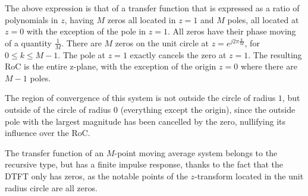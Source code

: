 \documentclass[\documentfontsize, twocolumn]{\classname}
\begin{document}
The above expression is that of a transfer function that is expressed as a ratio of polynomials in $z$, having $M$ zeros all located in $z = 1$ and $M$ poles, all located at $z=0$ with the exception of the pole in $z=1$. All zeros have their phase moving of a quantity $\frac 1 M$. There are $M$ zeros on the unit circle at $z=e^{j2\pi \frac k M}$, for $0 \leq k \leq M-1$. The pole at $z=1$ exactly cancels the zero at $z=1$. The resulting RoC is the entire z-plane, with the exception of the origin $z=0$ where there are $M-1$ poles.

\begin{center}
\end{center}

The region of convergence of this system is not outside the circle of radius $1$, but outside of the circle of radius $0$ (everything except the origin), since the outside pole with the largest magnitude has been cancelled by the zero, nullifying its influence over the RoC. 

The transfer function of an $M$-point moving average system belongs to the recursive type, but has a finite impulse response, thanks to the fact that the DTFT only has zeros, as the notable points of the $z$-transform located in the unit radius circle are all zeros.
\end{document}
